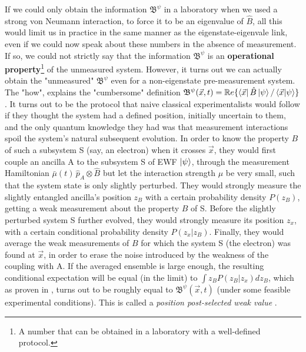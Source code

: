 \documentclass[11pt, a4paper]{article} %
\newcommand{\B}{\mathfrak{B}}
\begin{document}
If we could only obtain the information $\B^\psi$ in a laboratory when we used a strong von Neumann interaction, to force it to be an eigenvalue of $\hat{B}$, all this would limit us in practice in the same manner as the eigenstate-eigenvale link, even if we could now speak about these numbers in the absence of measurement. If so, we could not strictly say that the information $\B^\psi$ is an {\bf operational property}\footnote{A number that can be obtained in a laboratory with a well-defined protocol.} of the unmeasured system. However, it turns out we can actually obtain the "unmeasured" $\B^\psi$ even for a non-eigenstate pre-measurement system. The "how", explains the "cumbersome" definition $\B^\psi(\vec{x},t)=\mathbb{R}e\{\bra{\vec{x}}\hat{B}\ket{\psi}/\bra{\vec{x}}\ket{\psi}\}$. It turns out to be the protocol that naive classical experimentalists \cite{WisemanVel} would follow if they thought the system had a defined position, initially uncertain to them, and the only quantum knowledge they had was that measurement interactions spoil the system's natural subsequent evolution. In order to know the property $B$ of such a subsystem S (say, an electron) when it crosses $\vec{x}$, they would first couple an ancilla A to the subsystem S of EWF $\ket{\psi}$, through the measurement Hamiltonian $\bar{\mu}(t)\,\hat{p}_A\otimes\hat{B}$ but let the interaction strength $\mu$ be very small, such that the system state is only slightly perturbed. They would strongly measure the slightly entangled ancilla's position $z_B$ with a certain probability density $P(z_B)$, getting a weak measurement about the property $B$ of S. Before the slightly perturbed system S further evolved, they would strongly measure its position $z_x$, with a certain conditional probability density $P(z_x|z_B)$. Finally, they would average the weak measurements of $B$ for which the system S (the electron) was found at $\vec{x}$, in order to erase the noise introduced by the weakness of the coupling with A. If the averaged ensemble is large enough, the resulting conditional expectation will be equal (in the limit) to $\int z_B P(z_B|z_x)dz_B$, which as proven in \cite{DevInPosition2}, turns out to be roughly equal to $\B^\psi(\vec{x},t)$ (under some feasible experimental conditions). This is called a {\em position post-selected weak value} \cite{Weak}.
\end{document}
